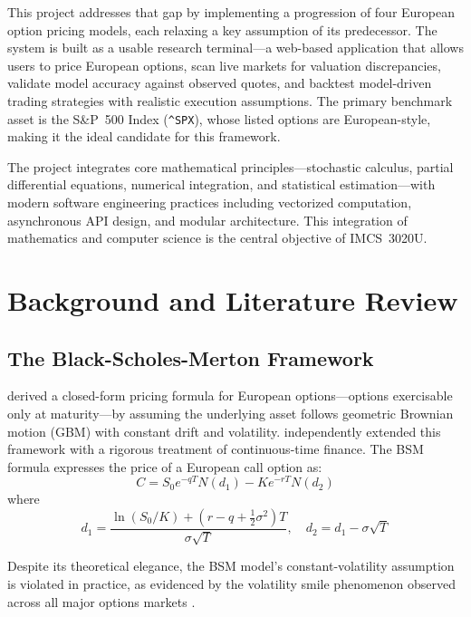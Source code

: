 \documentclass[12pt,a4paper]{article}
\begin{document}
This project addresses that gap by implementing a progression of four European option pricing models, each relaxing a key assumption of its predecessor. The system is built as a usable research terminal---a web-based application that allows users to price European options, scan live markets for valuation discrepancies, validate model accuracy against observed quotes, and backtest model-driven trading strategies with realistic execution assumptions. The primary benchmark asset is the S\&P~500 Index (\texttt{\^{}SPX}), whose listed options are European-style, making it the ideal candidate for this framework.

The project integrates core mathematical principles---stochastic calculus, partial differential equations, numerical integration, and statistical estimation---with modern software engineering practices including vectorized computation, asynchronous API design, and modular architecture. This integration of mathematics and computer science is the central objective of IMCS~3020U.

\section{Background and Literature Review}

\subsection{The Black-Scholes-Merton Framework}

\textcite{black1973} derived a closed-form pricing formula for European options---options exercisable only at maturity---by assuming the underlying asset follows geometric Brownian motion (GBM) with constant drift and volatility. \textcite{merton1973} independently extended this framework with a rigorous treatment of continuous-time finance. The BSM formula expresses the price of a European call option as:
\begin{equation}
C = S_0 e^{-qT} N(d_1) - K e^{-rT} N(d_2)
\end{equation}
where
\begin{equation}
d_1 = \frac{\ln(S_0/K) + (r - q + \tfrac{1}{2}\sigma^2)T}{\sigma\sqrt{T}}, \quad d_2 = d_1 - \sigma\sqrt{T}
\end{equation}

Despite its theoretical elegance, the BSM model's constant-volatility assumption is violated in practice, as evidenced by the volatility smile phenomenon observed across all major options markets \parencite{hull2018}.
\end{document}
